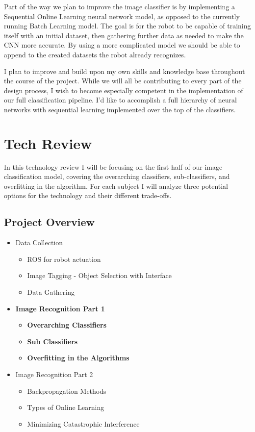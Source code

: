 \documentclass[draftclsnofoot, onecolumn, 10pt, compsoc]{IEEEtran}
\begin{document}
		Part of the way we plan to improve the image classifier is by implementing a Sequential Online Learning neural network model, as opposed to the currently running Batch Learning model. The goal is for the robot to be capable of training itself with an initial dataset, then gathering further data as needed to make the CNN more accurate. By using a more complicated model we should be able to append to the created datasets the robot already recognizes. 
		
		I plan to improve and build upon my own skills and knowledge base throughout the course of the project. While we will all be contributing to every part of the design process, I wish to become especially competent in the implementation of our full classification pipeline. I'd like to accomplish a full hierarchy of neural networks with sequential learning implemented over the top of the classifiers. 
	
	\section{Tech Review}
		In this technology review I will be focusing on the first half of our image classification model, covering the overarching classifiers, sub-classifiers, and overfitting in the algorithm. For each subject I will analyze three potential options for the technology and their different trade-offs. 
		
		\subsection{Project Overview}
			\begin{itemize}
				\item Data Collection
					\begin{itemize}
						\item ROS for robot actuation
						\item Image Tagging - Object Selection with Interface
						\item Data Gathering
					\end{itemize}
				
				\item \textbf{Image Recognition Part 1}
					\begin{itemize}
						\item \textbf{Overarching Classifiers}
						\item \textbf{Sub Classifiers}
						\item \textbf{Overfitting in the Algorithms}
					\end{itemize}
				
				\item Image Recognition Part 2
					\begin{itemize}
						\item Backpropagation Methods
						\item Types of Online Learning
						\item Minimizing Catastrophic Interference
					\end{itemize}
			\end{itemize}
		
\end{document}

